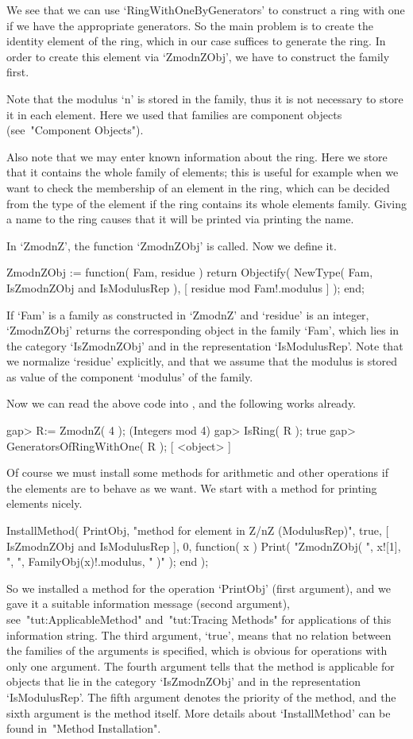 We see that we can use `RingWithOneByGenerators' to construct a ring
with one if we have the appropriate generators.
So the main problem is to create the identity element of the ring,
which in our case suffices to generate the ring.
In order to create this element via `ZmodnZObj',
we have to construct the family first.

Note that the modulus `n' is stored in the family,
thus it is not necessary to store it in each element.
Here we used that families are component objects
(see~"Component Objects").

Also note that we may enter known information about the ring.
Here we store that it contains the whole family of elements;
this is useful for example when we want to check the membership of an
element in the ring, which can be decided from the type of the element
if the ring contains its whole elements family.
Giving a name to the ring causes that it will be printed
via printing the name.

In `ZmodnZ', the function `ZmodnZObj' is called.
Now we define it.

\begintt
    ZmodnZObj := function( Fam, residue )
        return Objectify( NewType( Fam, IsZmodnZObj and IsModulusRep ),
                          [ residue mod Fam!.modulus ] );
    end;
\endtt

If `Fam' is a family as constructed in `ZmodnZ'
and `residue' is an integer,
`ZmodnZObj' returns the corresponding object in the family `Fam',
which lies in the category `IsZmodnZObj' and in the representation
`IsModulusRep'.
Note that we normalize `residue' explicitly,
and that we assume that the modulus is stored as value of the component
`modulus' of the family.

Now we can read the above code into {\GAP},
and the following works already.

\begintt
    gap> R:= ZmodnZ( 4 );
    (Integers mod 4)
    gap> IsRing( R );
    true
    gap> GeneratorsOfRingWithOne( R );
    [ <object> ]
\endtt

Of course we must install some methods for arithmetic and other
operations if the elements are to behave as we want.
We start with a method for printing elements nicely.

\begintt
    InstallMethod( PrintObj,
        "method for element in Z/nZ (ModulusRep)",
        true,
        [ IsZmodnZObj and IsModulusRep ], 0,
        function( x )
        Print( "ZmodnZObj( ", x![1], ", ", FamilyObj(x)!.modulus, " )" );
        end );
\endtt

So we installed a method for the operation `PrintObj' (first argument),
and we gave it a suitable information message (second argument),
see~"tut:ApplicableMethod" and~"tut:Tracing Methods" for applications of
this information string.
The third argument, `true', means that no relation between the families
of the arguments is specified, which is obvious for operations with only
one argument.
The fourth argument tells {\GAP} that the method is applicable for
objects that lie in the category `IsZmodnZObj' and in the representation
`IsModulusRep'.
The fifth argument denotes the priority of the method,
and the sixth argument is the method itself.
More details about `InstallMethod' can be found in~"Method Installation".

